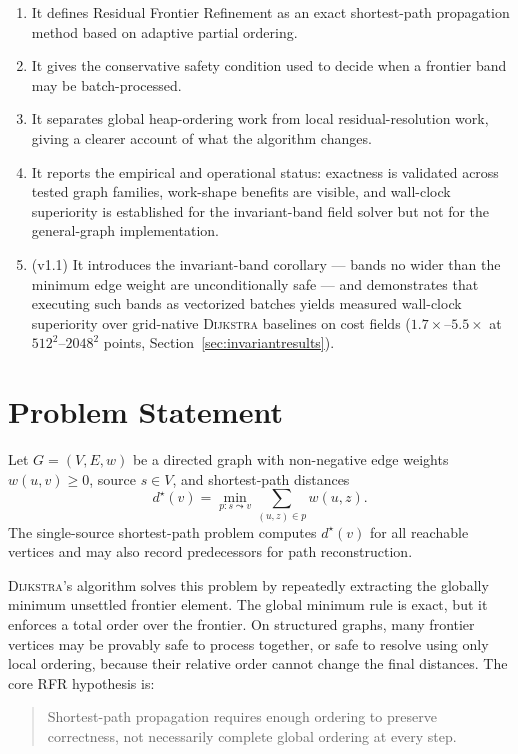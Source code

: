 \documentclass[11pt]{article}
\newcommand{\RFR}{\textsc{RFR}}
\newcommand{\Dijkstra}{\textsc{Dijkstra}}
\newcommand{\vertices}{V}
\newcommand{\edges}{E}
\begin{document}
\begin{enumerate}
  \item It defines Residual Frontier Refinement as an exact shortest-path propagation method based on adaptive partial ordering.
  \item It gives the conservative safety condition used to decide when a frontier band may be batch-processed.
  \item It separates global heap-ordering work from local residual-resolution work, giving a clearer account of what the algorithm changes.
  \item It reports the empirical and operational status: exactness is validated across tested graph families, work-shape benefits are visible, and wall-clock superiority is established for the invariant-band field solver but not for the general-graph implementation.
  \item (v1.1) It introduces the invariant-band corollary --- bands no wider than the minimum edge weight are unconditionally safe --- and demonstrates that executing such bands as vectorized batches yields measured wall-clock superiority over grid-native \Dijkstra{} baselines on cost fields ($1.7\times$--$5.5\times$ at $512^2$--$2048^2$ points, Section~\ref{sec:invariantresults}).
\end{enumerate}

\section{Problem Statement}
\label{sec:problem}

Let $G=(\vertices,\edges,w)$ be a directed graph with non-negative edge weights $w(u,v)\ge 0$, source $s\in \vertices$, and shortest-path distances
\[
  d^\star(v)=\min_{p:s\leadsto v}\sum_{(u,z)\in p} w(u,z).
\]
The single-source shortest-path problem computes $d^\star(v)$ for all reachable vertices and may also record predecessors for path reconstruction.

\Dijkstra{}'s algorithm \cite{dijkstra1959} solves this problem by repeatedly extracting the globally minimum unsettled frontier element. The global minimum rule is exact, but it enforces a total order over the frontier. On structured graphs, many frontier vertices may be provably safe to process together, or safe to resolve using only local ordering, because their relative order cannot change the final distances. The core \RFR{} hypothesis is:

\begin{quote}
Shortest-path propagation requires enough ordering to preserve correctness, not necessarily complete global ordering at every step.
\end{quote}
\end{document}
